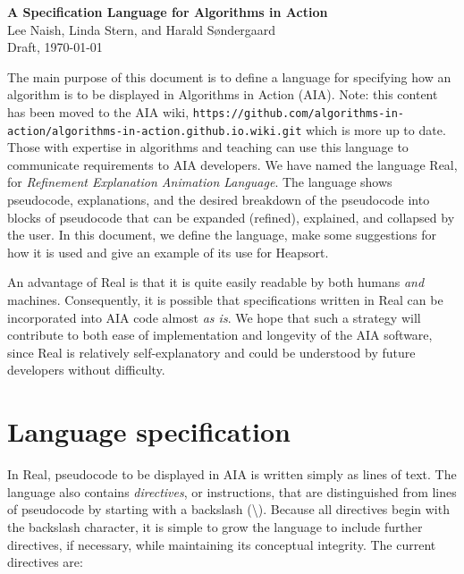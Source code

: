 \documentclass[11pt]{article}
\begin{document}
\begin{center}
{\LARGE\bf A Specification Language for Algorithms in Action} \\[1ex]
Lee Naish, Linda Stern, and Harald S{\o}ndergaard \\
Draft, \today
\end{center}

The main purpose of this document is to define a language for
specifying how an algorithm is to be displayed in Algorithms in Action
(AIA).
Note: this content has been moved to the AIA wiki,
\texttt{https://github.com/algorithms-in-action/algorithms-in-action.github.io.wiki.git}
which is more up to date.
Those with expertise in algorithms and teaching can use this
language to communicate requirements to AIA developers.  We have named
the language Real, for {\it Refinement Explanation Animation Language}.
The language shows pseudocode, explanations, and the desired breakdown of
the pseudocode into blocks of pseudocode that can be expanded (refined),
explained, and collapsed by the user.  In this document, we define the
language, make some suggestions for how it is used and give an example
of its use for Heapsort.

An advantage of Real is that it is quite easily readable by both humans
\emph{and} machines.  Consequently, it is possible that specifications
written in Real can be incorporated into AIA code almost \emph{as
is}.  We hope that such a strategy will contribute to both ease
of implementation and longevity of the AIA software, since Real is
relatively self-explanatory and could be understood by future developers
without difficulty.


\section{Language specification}

In Real, pseudocode to be displayed in AIA is written simply as lines
of text.  The language also contains {\it directives}, or instructions,
that are distinguished from lines of pseudocode by starting with a
backslash (\textbackslash).  Because all directives begin with the
backslash character, it is simple to grow the language to include further
directives, if necessary, while maintaining its conceptual integrity.
The current directives are:
\end{document}
